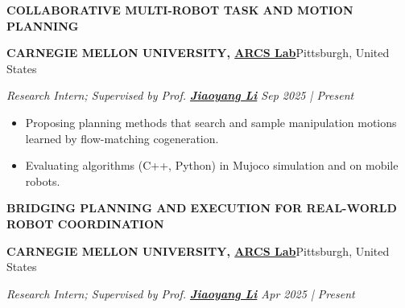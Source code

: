 \documentclass[a4paper,9pt]{extarticle}
\begin{document}
{\textbf{\fontsize{12pt}{4pt}\selectfont C}\textbf{\scshape OLLABORATIVE MULTI-ROBOT TASK AND MOTION PLANNING}}
\par\vspace{4pt}\noindent
\par\textbf{CARNEGIE MELLON UNIVERSITY, {\href{https://www.ri.cmu.edu/robotics-groups/arcs-lab/}{ARCS Lab}}}\hfill Pittsburgh, United States   %
\par\textit{Research Intern; Supervised by Prof. {\href{https://jiaoyangli.me/}{\textbf{Jiaoyang Li}}} \hfill Sep 2025 | Present}  %
\begin{itemize}
    \item Proposing planning methods that search and sample manipulation motions learned by flow-matching cogeneration. 
    \item Evaluating algorithms (C++, Python) in Mujoco simulation and on mobile robots.
\end{itemize}
{\textbf{\fontsize{12pt}{4pt}\selectfont B}\textbf{\scshape RIDGING PLANNING AND EXECUTION FOR REAL-WORLD ROBOT COORDINATION}}
\par\vspace{4pt}\noindent
\par\textbf{CARNEGIE MELLON UNIVERSITY, {\href{https://www.ri.cmu.edu/robotics-groups/arcs-lab/}{ARCS Lab}}}\hfill Pittsburgh, United States   %
\par\textit{Research Intern; Supervised by Prof. {\href{https://jiaoyangli.me/}{\textbf{Jiaoyang Li}}} \hfill Apr 2025 | Present}  %
\end{document}
